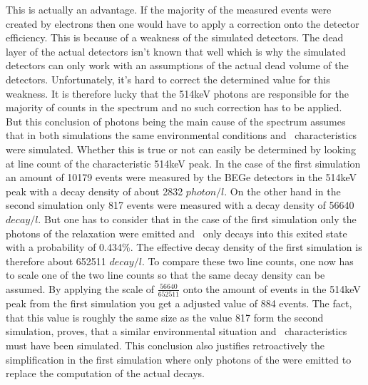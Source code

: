\documentclass[encoding=utf8,british]{tumphthesis}
\begin{document}
This is actually an advantage.
If the majority of the measured events were created by electrons then one would have to apply a correction onto the detector efficiency.
This is because of a weakness of the simulated detectors.
The dead layer of the actual detectors isn't known that well which is why the simulated detectors can only work with an assumptions of the actual dead volume of the detectors.
Unfortunately, it's hard to correct the determined value for this weakness.
It is therefore lucky that the 514keV photons are responsible for the majority of counts in the spectrum and no such correction has to be applied.
\\

But this conclusion of photons being the main cause of the spectrum assumes that in both simulations the same environmental conditions and \Kr\ characteristics were simulated.
Whether this is true or not can easily be determined by looking at line count of the characteristic 514keV peak.
In the case of the first simulation an amount of 10179 events were measured by the BEGe detectors in the 514keV peak with a decay density of about 2832 $\unit{photon}/\unit{l}$.
On the other hand in the second simulation only 817 events were measured with a decay density of 56640$\unit{decay}/\unit{l}$.
But one has to consider that in the case of the first simulation only the photons of the  relaxation were emitted and \Kr\ only decays into this exited state with a probability of 0.434$\%$.
The effective decay density of the first simulation is therefore about 652511 $\unit{decay}/\unit{l}$.
To compare these two line counts, one now has to scale one of the two line counts so that the same decay density can be assumed.
By applying the scale of $\frac{56640}{652511}$ onto the amount of events in the 514keV peak from the first simulation you get a adjusted value of 884 events.
The fact, that this value is roughly the same size as the value 817 form the second simulation, proves, that a similar environmental situation and \Kr\ characteristics must have been simulated.
This conclusion also justifies retroactively the simplification in the first simulation where only photons of the  were emitted to replace the computation of the actual decays.
\\
\end{document}
